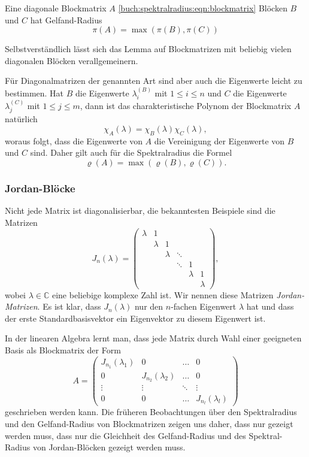\begin{lemma}
\label{buch:spektralradius:lemma:diagonalbloecke}
Eine diagonale Blockmatrix $A$ \eqref{buch:spektralradius:eqn:blockmatrix}
Blöcken $B$ und $C$  hat Gelfand-Radius
\[
\pi(A) = \max ( \pi(B), \pi(C) )
\]
\end{lemma}

Selbstverständlich lässt sich das Lemma auf Blockmatrizen mit beliebig
vielen diagonalen Blöcken verallgemeinern.

Für Diagonalmatrizen der genannten Art sind aber auch die 
Eigenwerte leicht zu bestimmen.
Hat $B$ die Eigenwerte $\lambda_i^{(B)}$ mit $1\le i\le n$ und $C$ die
Eigenwerte $\lambda_j^{(C)}$ mit $1\le j\le m$, dann ist das charakteristische
Polynom der Blockmatrix $A$ natürlich
\[
\chi_A(\lambda) = \chi_B(\lambda)\chi_C(\lambda),
\]
woraus folgt, dass die Eigenwerte von $A$ die Vereinigung der Eigenwerte
von $B$ und $C$ sind.
Daher gilt auch für die Spektralradius die Formel
\[
\varrho(A) = \max(\varrho(B) , \varrho(C)).
\]

\subsubsection{Jordan-Blöcke}
Nicht jede Matrix ist diagonalisierbar, die bekanntesten Beispiele sind
die Matrizen
\begin{equation}
J_n(\lambda)
=
\begin{pmatrix}
\lambda &      1&       &       &       &       \\
        &\lambda&      1&       &       &       \\[-5pt]
        &       &\lambda&\ddots &       &       \\[-5pt]
        &       &       &\ddots &      1&       \\
        &       &       &       &\lambda&      1\\
        &       &       &       &       &\lambda
\end{pmatrix},
\label{buch:spektralradius:eqn:jordan}
\end{equation}
wobei $\lambda\in\mathbb C$ eine beliebige komplexe Zahl ist.
Wir nennen diese Matrizen {\em Jordan-Matrizen}.
Es ist klar, dass $J_n(\lambda)$ nur den $n$-fachen Eigenwert
$\lambda$ hat und dass der erste Standardbasisvektor ein
Eigenvektor zu diesem Eigenwert ist.

In der linearen Algebra lernt man, dass jede Matrix durch Wahl
einer geeigneten Basis als
Blockmatrix der Form
\[
A
=
\begin{pmatrix}
J_{n_1}(\lambda_1) &        0         & \dots & 0 \\
       0         & J_{n_2}(\lambda_2) & \dots & 0 \\[-4pt]
\vdots           &\vdots            &\ddots &\vdots \\
       0         &        0         & \dots &J_{n_l}(\lambda_l)
\end{pmatrix}
\]
geschrieben werden kann.
Die früheren Beobachtungen über den Spektralradius und den
Gelfand-Radius von Blockmatrizen zeigen uns daher, dass
nur gezeigt werden muss, dass nur die Gleichheit des Gelfand-Radius
und des Spektral-Radius von Jordan-Blöcken gezeigt werden muss.


